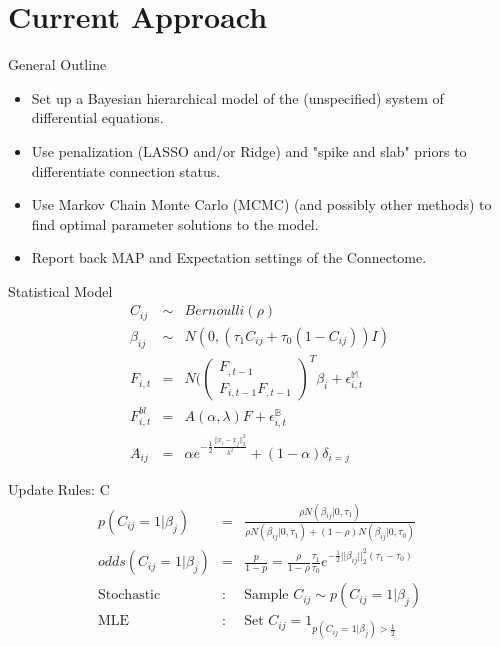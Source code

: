 \documentclass{beamer}
\begin{document}
\section{Current Approach}

\begin{frame}{General Outline}
\begin{itemize}
\item Set up a Bayesian hierarchical model of the (unspecified) system of differential equations.
\item Use penalization (LASSO and/or Ridge) and "spike and slab" priors to differentiate connection status.
\item Use Markov Chain Monte Carlo (MCMC) (and possibly other methods) to find optimal parameter solutions to the model.
\item Report back MAP and Expectation settings of the Connectome.
\end{itemize}
\end{frame}

\begin{frame}{Statistical Model}
\begin{eqnarray}
C_{ij} & \sim & Bernoulli( \rho ) \\
\beta_{ij} & \sim & N( 0, ( \tau_1 C_{ij} + \tau_0 (1-C_{ij}) ) I ) \\
F_{i,t} & = & N( \left(\begin{smallmatrix} F_{\dot,t-1} \\ F_{i,t-1}F_{\dot,t-1} \end{smallmatrix}\right)^T \beta_i + \epsilon_{i,t}^{\mathbb{M}} \\
F_{i,t}^{bl} & = & A(\alpha, \lambda) F + \epsilon_{i,t}^{\mathbb{B}} \\
A_{ij} &=& \alpha e^{-\frac12 \frac{ || x_i - x_j ||_2^2 }{ \lambda^2 } } + (1 - \alpha) \delta_{i=j}
\end{eqnarray}
\end{frame}

\begin{frame}{Update Rules: C}
\begin{eqnarray}
p( C_{ij} = 1 | \beta_j ) &=& \frac{ \rho N( \beta_{ij} | 0, \tau_1 ) }{ \rho N( \beta_{ij} | 0, \tau_1 ) + (1-\rho) N( \beta_{ij} | 0, \tau_0 )} \\
odds( C_{ij} = 1 | \beta_j  ) & = & \frac{p}{1-p} = \frac{\rho}{1-\rho} \frac{\tau_1}{\tau_0} e^{-\frac12 ||\beta_{ij}||_2^2 ( \tau_1 - \tau_0 ) }\\
\text{Stochastic} & : & \text{Sample } C_{ij} \sim p( C_{ij} = 1 | \beta_j ) \\
\text{MLE} & : & \text{Set } C_{ij} = 1_{ p( C_{ij} = 1 | \beta_j ) > \frac12 }
\end{eqnarray}
\end{frame}
\end{document}
